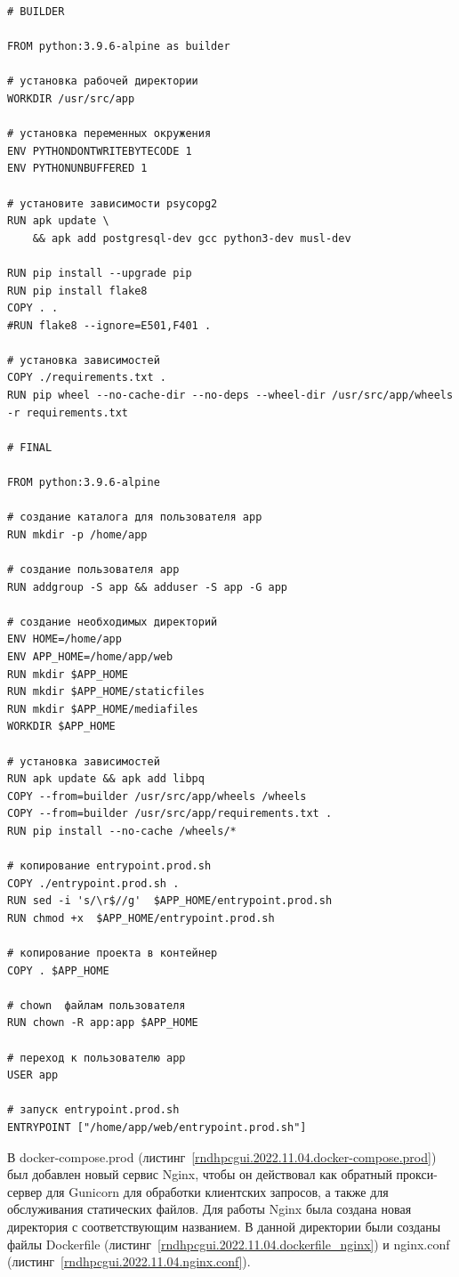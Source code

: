 \begin{lstlisting}[frame=single, label={rndhpcgui.2022.11.04.dockerfile.prod}, caption={Dockerfile.prod}, language={docker}] 
# BUILDER

FROM python:3.9.6-alpine as builder

# установка рабочей директории
WORKDIR /usr/src/app

# установка переменных окружения
ENV PYTHONDONTWRITEBYTECODE 1
ENV PYTHONUNBUFFERED 1

# установите зависимости psycopg2
RUN apk update \
    && apk add postgresql-dev gcc python3-dev musl-dev

RUN pip install --upgrade pip
RUN pip install flake8
COPY . .
#RUN flake8 --ignore=E501,F401 .

# установка зависимостей
COPY ./requirements.txt .
RUN pip wheel --no-cache-dir --no-deps --wheel-dir /usr/src/app/wheels -r requirements.txt

# FINAL

FROM python:3.9.6-alpine

# создание каталога для пользователя app
RUN mkdir -p /home/app

# создание пользователя app
RUN addgroup -S app && adduser -S app -G app

# создание необходимых директорий
ENV HOME=/home/app
ENV APP_HOME=/home/app/web
RUN mkdir $APP_HOME
RUN mkdir $APP_HOME/staticfiles
RUN mkdir $APP_HOME/mediafiles
WORKDIR $APP_HOME

# установка зависимостей
RUN apk update && apk add libpq
COPY --from=builder /usr/src/app/wheels /wheels
COPY --from=builder /usr/src/app/requirements.txt .
RUN pip install --no-cache /wheels/*

# копирование entrypoint.prod.sh
COPY ./entrypoint.prod.sh .
RUN sed -i 's/\r$//g'  $APP_HOME/entrypoint.prod.sh
RUN chmod +x  $APP_HOME/entrypoint.prod.sh

# копирование проекта в контейнер
COPY . $APP_HOME

# chown  файлам пользователя
RUN chown -R app:app $APP_HOME

# переход к пользователю app
USER app

# запуск entrypoint.prod.sh
ENTRYPOINT ["/home/app/web/entrypoint.prod.sh"]
\end{lstlisting}
	
В \textsf{docker-compose.prod} (листинг~\ref{rndhpcgui.2022.11.04.docker-compose.prod}) был добавлен новый сервис \textsf{Nginx}, чтобы он действовал как обратный прокси-сервер для \textsf{Gunicorn} для обработки клиентских запросов, а также для обслуживания статических файлов. Для работы \textsf{Nginx} была создана новая директория с соответствующим названием. В данной директории были созданы файлы \textsf{Dockerfile} (листинг~\ref{rndhpcgui.2022.11.04.dockerfile_nginx}) и \textsf{nginx.conf} (листинг~\ref{rndhpcgui.2022.11.04.nginx.conf}).


